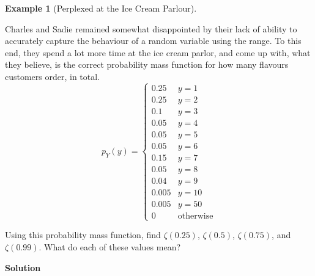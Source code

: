 \documentclass[
  letterpaper,
  DIV=11,
  numbers=noendperiod]{scrreprt}
\theoremstyle{definition}
\theoremstyle{definition}
\newtheorem{example}{Example}[chapter]
\theoremstyle{definition}
\theoremstyle{remark}
\begin{document}
\begin{example}[Perplexed at the Ice Cream
Parlour]\protect\hypertarget{exm-percentile}{}\label{exm-percentile}

Charles and Sadie remained somewhat disappointed by their lack of
ability to accurately capture the behaviour of a random variable using
the range. To this end, they spend a lot more time at the ice cream
parlor, and come up with, what they believe, is the correct probability
mass function for how many flavours customers order, in total. \[
p_Y(y) = \begin{cases} 
    0.25 & y = 1 \\
    0.25 & y = 2 \\
    0.1 & y = 3 \\
    0.05 & y = 4 \\
    0.05 & y = 5 \\
    0.05 & y = 6 \\
    0.15 & y = 7 \\
    0.05 & y = 8 \\
    0.04 & y = 9 \\
    0.005 & y = 10 \\ 
    0.005 & y = 50 \\
    0 & \text{otherwise}
\end{cases}
\]

Using this probability mass function, find \(\zeta(0.25)\),
\(\zeta(0.5)\), \(\zeta(0.75)\), and \(\zeta(0.99)\). What do each of
these values mean?

\begin{tcolorbox}[enhanced jigsaw, colback=white, colframe=quarto-callout-color-frame, arc=.35mm, leftrule=.75mm, rightrule=.15mm, opacityback=0, breakable, bottomrule=.15mm, left=2mm, toprule=.15mm]

\vspace{-3mm}\textbf{Solution}\vspace{3mm}


\end{tcolorbox}
\end{example}
\end{document}
